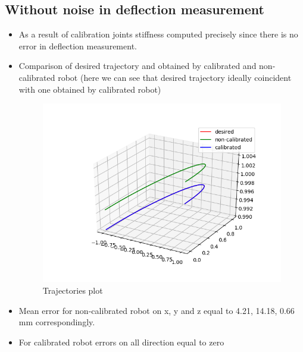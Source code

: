 \documentclass[12pt]{article}
\begin{document}
	\subsection{Without noise in deflection measurement}
	\begin{itemize}
		\item As a result of calibration joints stiffness computed precisely since there is no error in deflection measurement. 
		\item Comparison of desired trajectory and obtained by calibrated and non-calibrated robot (here we can see that desired trajectory ideally coincident with one obtained by calibrated robot)
		\begin{figure}[H]
			\centering
			\includegraphics[scale=0.6]{no_noise.png}
			\caption{Trajectories plot}
		\end{figure}
		\item Mean error for non-calibrated robot on x, y and z equal to 4.21, 14.18, 0.66 mm correspondingly.
		
		\item For calibrated robot errors on all direction equal to zero
	\end{itemize}
\end{document}
